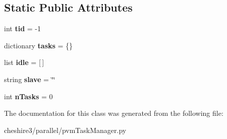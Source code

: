 \subsection*{Static Public Attributes}
\begin{DoxyCompactItemize}
\item 
\hypertarget{classcheshire3_1_1parallel_1_1pvm_task_manager_1_1_task_manager_a12d4f37865e7554d993f710833e4e677}{int {\bfseries tid} = -\/1}\label{classcheshire3_1_1parallel_1_1pvm_task_manager_1_1_task_manager_a12d4f37865e7554d993f710833e4e677}

\item 
\hypertarget{classcheshire3_1_1parallel_1_1pvm_task_manager_1_1_task_manager_a4d91ae7e40bd251e36f707bcb9335fac}{dictionary {\bfseries tasks} = \{\}}\label{classcheshire3_1_1parallel_1_1pvm_task_manager_1_1_task_manager_a4d91ae7e40bd251e36f707bcb9335fac}

\item 
\hypertarget{classcheshire3_1_1parallel_1_1pvm_task_manager_1_1_task_manager_a1e8e0ef8a4b0853805a94ddb9ef3f4b5}{list {\bfseries idle} = \mbox{[}$\,$\mbox{]}}\label{classcheshire3_1_1parallel_1_1pvm_task_manager_1_1_task_manager_a1e8e0ef8a4b0853805a94ddb9ef3f4b5}

\item 
\hypertarget{classcheshire3_1_1parallel_1_1pvm_task_manager_1_1_task_manager_aeea67e3fed8fbce6e2dfbc30ee3f35cb}{string {\bfseries slave} = \char`\"{}\char`\"{}}\label{classcheshire3_1_1parallel_1_1pvm_task_manager_1_1_task_manager_aeea67e3fed8fbce6e2dfbc30ee3f35cb}

\item 
\hypertarget{classcheshire3_1_1parallel_1_1pvm_task_manager_1_1_task_manager_a36398f50be3737a80daeed1c3f894e03}{int {\bfseries n\-Tasks} = 0}\label{classcheshire3_1_1parallel_1_1pvm_task_manager_1_1_task_manager_a36398f50be3737a80daeed1c3f894e03}

\end{DoxyCompactItemize}


The documentation for this class was generated from the following file\-:\begin{DoxyCompactItemize}
\item 
cheshire3/parallel/pvm\-Task\-Manager.\-py\end{DoxyCompactItemize}

